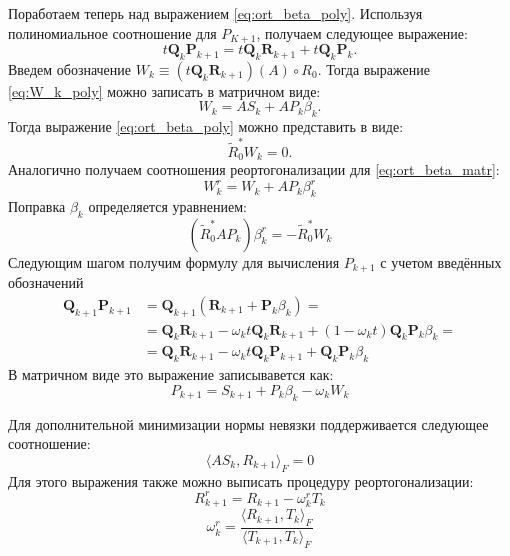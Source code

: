 Поработаем теперь над выражением \eqref{eq:ort_beta_poly}. Используя полиномиальное соотношение для 
$P_{K+1}$, получаем следующее выражение:
\begin{equation}
    \label{eq:W_k_poly}
    t\mathbf{Q}_k\mathbf{P}_{k+1} = t\mathbf{Q}_k\mathbf{R}_{k+1} + t\mathbf{Q}_k\mathbf{P}_k.
\end{equation}
Введем обозначение $W_k \equiv (t \mathbf{Q}_k \mathbf{R}_{k+1} )(A) \circ R_0$. 
Тогда выражение \eqref{eq:W_k_poly} можно записать в матричном виде:
\begin{equation}
    \label{eq:W_k_matr}
    W_k = AS_k + AP_k\beta_k.
\end{equation}
Тогда выражение \eqref{eq:ort_beta_poly} можно представить в виде: 
\begin{equation}
    \label{eq:ort_beta_matr}
    \tilde{R}_0^*W_k = 0.
\end{equation}
Аналогично получаем соотношения реортогонализации для \eqref{eq:ort_beta_matr}:
\begin{equation*}
    W_k^r = W_k + AP_k\beta_k^r
\end{equation*}
Поправка $\beta_k$ определяется уравнением:
\begin{equation*}
    (\tilde{R}_0^*AP_k)\beta_k^r = -\tilde{R}_0^*W_k
\end{equation*}
Следующим шагом получим формулу для вычисления $P_{k+1}$ с учетом введённых обозначений
\begin{align*}
    \mathbf{Q}_{k+1}\mathbf{P}_{k+1} &= \mathbf{Q}_{k+1}(\mathbf{R}_{k+1} + \mathbf{P}_{k}\beta_k) = \\
                                     &= \mathbf{Q}_{k}\mathbf{R}_{k+1} - \omega_kt\mathbf{Q}_{k}\mathbf{R}_{k+1} + (1-\omega_kt)\mathbf{Q}_{k}\mathbf{P}_{k}\beta_k = \\
                                     &= \mathbf{Q}_{k} \mathbf{R}_{k+1} - \omega_kt\mathbf{Q}_{k}\mathbf{P}_{k+1} + \mathbf{Q}_{k} \mathbf{P}_{k} \beta_k
\end{align*}
В матричном виде это выражение записывавется как:
\begin{equation*}
    P_{k+1} = S_{k+1} + P_k \beta_k - \omega_k W_k
\end{equation*}

Для дополнительной минимизации нормы невязки поддерживается следующее соотношение:
$$ \langle AS_k,R_{k+1}\rangle_F=0 $$
Для этого выражения также можно выписать процедуру реортогонализации:
\begin{equation*}
    R_{k+1}^r = R_{k+1} - \omega_k^r T_k
\end{equation*}
\begin{equation*}
    \omega_k^r = \frac{\langle R_{k+1}, T_k \rangle_F}{\langle T_{k+1}, T_k \rangle_F}
\end{equation*}

